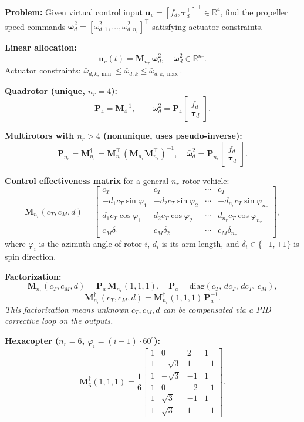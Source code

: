 \documentclass[11pt,a4paper]{article}
\newcommand{\vect}[1]{\bm{#1}}
\newcommand{\R}{\mathbb{R}}
\newcommand{\diag}{\mathrm{diag}}
\begin{document}
\textbf{Problem:} Given virtual control input $\vect{u}_v = [f_d, \vect\tau_d^\top]^\top\in\R^4$, find the propeller speed commands $\bar{\vect{\omega}}^2_d = [\bar\omega_{d,1}^2,\ldots,\bar\omega_{d,n_r}^2]^\top$ satisfying actuator constraints.

\textbf{Linear allocation:}
\[
\vect{u}_v(t) = \mathbf{M}_{n_r}\,\bar{\vect\omega}_d^2,\quad
\bar{\vect\omega}_d^2\in\R^{n_r}.
\]
Actuator constraints: $\bar\omega_{d,k,\min}\le\bar\omega_{d,k}\le\bar\omega_{d,k,\max}$.

\textbf{Quadrotor (unique, $n_r=4$):}
\[
\mathbf{P}_4 = \mathbf{M}_4^{-1},\qquad
\bar{\vect\omega}_d^2 = \mathbf{P}_4\begin{bmatrix}f_d\\\vect\tau_d\end{bmatrix}.
\]

\textbf{Multirotors with $n_r>4$ (nonunique, uses pseudo-inverse):}
\[
\boxed{
\mathbf{P}_{n_r} = \mathbf{M}_{n_r}^\dagger
= \mathbf{M}_{n_r}^\top\!\left(\mathbf{M}_{n_r}\mathbf{M}_{n_r}^\top\right)^{-1},
\quad
\bar{\vect\omega}_d^2 = \mathbf{P}_{n_r}\begin{bmatrix}f_d\\\vect\tau_d\end{bmatrix}.
}
\]

\textbf{Control effectiveness matrix} for a general $n_r$-rotor vehicle:
\[
\mathbf{M}_{n_r}(c_T,c_M,d) =
\begin{bmatrix}
c_T & c_T & \cdots & c_T \\
-d_1 c_T\sin\varphi_1 & -d_2 c_T\sin\varphi_2 & \cdots & -d_{n_r}c_T\sin\varphi_{n_r}\\
d_1 c_T\cos\varphi_1 & d_2 c_T\cos\varphi_2 & \cdots & d_{n_r}c_T\cos\varphi_{n_r}\\
c_M\delta_1 & c_M\delta_2 & \cdots & c_M\delta_{n_r}
\end{bmatrix},
\]
where $\varphi_i$ is the azimuth angle of rotor $i$, $d_i$ is its arm length, and $\delta_i\in\{-1,+1\}$ is spin direction.

\textbf{Factorization:}
\[
\mathbf{M}_{n_r}(c_T,c_M,d) = \mathbf{P}_a\,\mathbf{M}_{n_r}(1,1,1),
\quad
\mathbf{P}_a = \diag(c_T,\,dc_T,\,dc_T,\,c_M),
\]
\[
\mathbf{M}_{n_r}^\dagger(c_T,c_M,d) = \mathbf{M}_{n_r}^\dagger(1,1,1)\,\mathbf{P}_a^{-1}.
\]
\textit{This factorization means unknown $c_T, c_M, d$ can be compensated via a PID corrective loop on the outputs.}

\textbf{Hexacopter ($n_r=6$, $\varphi_i=(i-1)\cdot60^\circ$):}
\[
\mathbf{M}_6^\dagger(1,1,1) = \frac{1}{6}
\begin{bmatrix}
1 & 0 & 2 & 1\\
1 & -\sqrt{3} & 1 & -1\\
1 & -\sqrt{3} & -1 & 1\\
1 & 0 & -2 & -1\\
1 & \sqrt{3} & -1 & 1\\
1 & \sqrt{3} & 1 & -1
\end{bmatrix}.
\]
\end{document}

